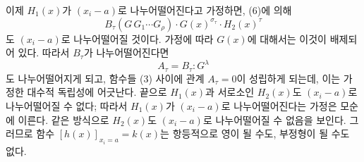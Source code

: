 
이제 $H_1(x)$가 $(x_i-a)$로 나누어떨어진다고 가정하면, (6)에 의해
\[
  B_\tau(G\,G_1\cdots G_\rho)\cdot G(x)^{\sigma_\tau}\cdot H_2(x)^\tau
\]
도 $(x_i-a)$로 나누어떨어질 것이다. 가정에 따라 $G(x)$에 대해서는 이것이 배제되어 있다. 따라서 $B_\tau$가 나누어떨어진다면
\[
  A_\tau=B_\tau:G^\lambda
\]
도 나누어떨어지게 되고, 함수들 (3) 사이에 관계 $A_\tau=0$이 성립하게 되는데, 이는 가정한 대수적 독립성에 어긋난다.
끝으로 $H_1(x)$과 서로소인 $H_2(x)$도 $(x_i-a)$로 나누어떨어질 수 없다; 따라서 $H_1(x)$가 $(x_i-a)$로 나누어떨어진다는 가정은 모순에 이른다. 같은 방식으로 $H_2(x)$도 $(x_i-a)$로 나누어떨어질 수 없음을 보인다. 그러므로 함수 $[h(x)]_{x_i=a}=k(x)$는 항등적으로 영이 될 수도, 부정형이 될 수도 없다.
